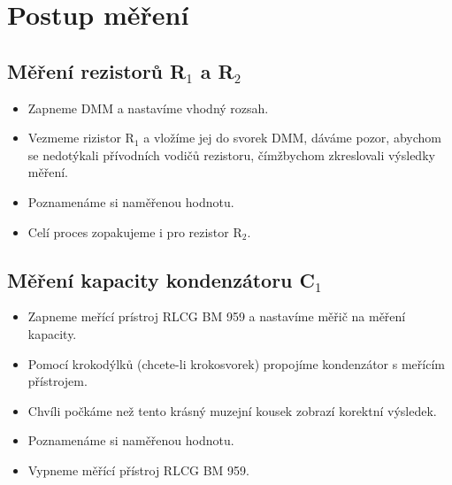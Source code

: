 \section{Postup měření}
  \subsection{Měření rezistorů R$_1$ a R$_2$}
    \begin{itemize}
      \item
        Zapneme DMM a nastavíme vhodný rozsah.
      \item
        Vezmeme rizistor R$_1$ a vložíme jej do svorek DMM, dáváme pozor, abychom se nedotýkali přívodních vodičů rezistoru, čímžbychom zkreslovali výsledky měření.
      \item
        Poznamenáme si naměřenou hodnotu.
      \item
        Celí proces zopakujeme i pro rezistor R$_2$.
    \end{itemize}
   
  \subsection{Měření kapacity kondenzátoru C$_1$}
    \begin{itemize}
      \item
        Zapneme meřící prístroj RLCG BM 959 a nastavíme měřič na měření kapacity.
      \item
        Pomocí krokodýlků (chcete-li krokosvorek) propojíme kondenzátor s meřícím přístrojem.
      \item
        Chvíli počkáme než tento krásný muzejní kousek zobrazí korektní výsledek.
       \item
        Poznamenáme si naměřenou hodnotu.
       \item
        Vypneme měřící přístroj RLCG BM 959.
    \end{itemize}
  
